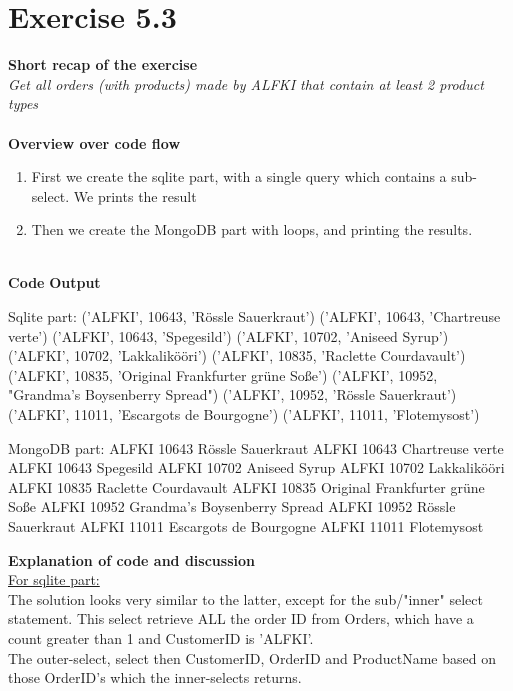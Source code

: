 \documentclass{article}
\newcommand\pythonstyle{\lstset{
language=python,
breaklines=true,
basicstyle=\ttfamily\small,
otherkeywords={1, 2, 3, 4, 5, 6, 7, 8 ,9 , 0, -, =, +, [, ], (, \), \{, \}, :, *, !},             %
keywordstyle=\color{blue},
emph={class, pass, in, for, while, if, is, elif, else, not, and, or, OR
    def, print, exec, break, continue, return},
emphstyle=\color{black}\bfseries,
emph={[2]True, False, None, self},
emphstyle=[2]\color{purple},
emph={[3]from, import, as},
emphstyle=[3]\color{blue},
stringstyle=\color{red},
frame=tb,
showstringspaces=false,
morecomment=[s]{"""}{"""},
commentstyle=\color{gray},
rulesepcolor=\color{blue},
title=\lstname
}}
\newcommand\pythonexternal[2][]{{
\pythonstyle
}}
\begin{document}
\section{Exercise 5.3}
\textbf{Short recap of the exercise}\\
\textit{Get all orders (with products) made by ALFKI that contain at least 2 product types}\\
~\\
\textbf{Overview over code flow}

\begin{enumerate}
  \item First we create the sqlite part, with a single query which contains a sub-select. We prints the result 
  \item Then we create the MongoDB part with loops, and printing the results. 
\end{enumerate}
~\\
\textbf{Code}
\textbf{Output}
\begin{pythonOutput}
Sqlite part:
('ALFKI', 10643, 'Rössle Sauerkraut')
('ALFKI', 10643, 'Chartreuse verte')
('ALFKI', 10643, 'Spegesild')
('ALFKI', 10702, 'Aniseed Syrup')
('ALFKI', 10702, 'Lakkalikööri')
('ALFKI', 10835, 'Raclette Courdavault')
('ALFKI', 10835, 'Original Frankfurter grüne Soße')
('ALFKI', 10952, "Grandma's Boysenberry Spread")
('ALFKI', 10952, 'Rössle Sauerkraut')
('ALFKI', 11011, 'Escargots de Bourgogne')
('ALFKI', 11011, 'Flotemysost')

MongoDB part:
ALFKI 10643 Rössle Sauerkraut
ALFKI 10643 Chartreuse verte
ALFKI 10643 Spegesild
ALFKI 10702 Aniseed Syrup
ALFKI 10702 Lakkalikööri
ALFKI 10835 Raclette Courdavault
ALFKI 10835 Original Frankfurter grüne Soße
ALFKI 10952 Grandma's Boysenberry Spread
ALFKI 10952 Rössle Sauerkraut
ALFKI 11011 Escargots de Bourgogne
ALFKI 11011 Flotemysost

\end{pythonOutput}
\textbf{Explanation of code and discussion}\\
\underline{For sqlite part:}~\\
The solution looks very similar to the latter, except for the sub/"inner" select statement. This select retrieve ALL the order ID from Orders, which have a count greater than 1 and CustomerID is 'ALFKI'. ~\\
The outer-select, select then CustomerID, OrderID and ProductName based on those OrderID's which the inner-selects returns. 
\end{document}
